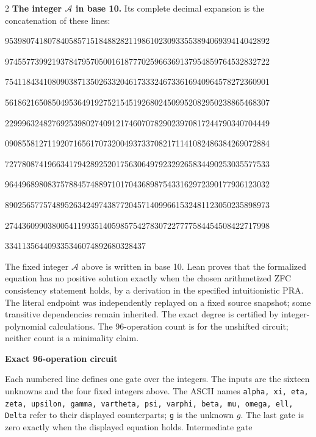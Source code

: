 \documentclass[10pt]{article}
\begin{document}
\begin{multicols}{2}
\textbf{The integer $\mathcal A$ in base 10.}
Its complete decimal expansion is the concatenation of these lines:\par
\begingroup\fontsize{7.7}{8.2}\selectfont{}\par
95398074180784058571518488282119861023093355389406939414042892\par
97455773992193784795705001618777025966369137954859764532832722\par
75411843410809038713502633204617333246733616940964578272360901\par
56186216508504953649192752154519268024509952082950238865468307\par
22999632482769253980274091217460707829023970817244790340704449\par
09085581271192071656170732004937337082171141082486384269072884\par
72778087419663417942892520175630649792329265834490253035577533\par
96449689808375788457488971017043689875433162972390177936123032\par
89025657757489526342497438772045714099661532481123050235898973\par
27443609903800541199351405985754278307227777584454508422717998\par
334113564409335346074892680328437\par
\endgroup
\normalfont\fontsize{7.7}{8.2}\selectfont
The fixed integer $\mathcal A$ above is written in base 10. Lean proves that
the formalized equation has no positive solution exactly when the chosen
arithmetized ZFC consistency statement holds, by a derivation in the specified
intuitionistic PRA. The literal endpoint was independently replayed on a fixed
source snapshot; some transitive dependencies remain inherited. The exact
degree is certified by integer-polynomial calculations. The 96-operation count
is for the unshifted circuit; neither count is a minimality claim.
\end{multicols}
\clearpage
\begin{center}{\large\bfseries Exact 96-operation circuit}\end{center}
Each numbered line defines one gate over the integers. The inputs are the
sixteen unknowns and the four fixed integers above. The ASCII names
\texttt{alpha, xi, eta, zeta, upsilon, gamma, vartheta, psi, varphi, beta, mu, omega, ell, Delta}
refer to their displayed counterparts; \texttt{g} is the unknown $g$. The last
gate is zero exactly when the displayed equation holds. Intermediate gate
\end{document}
